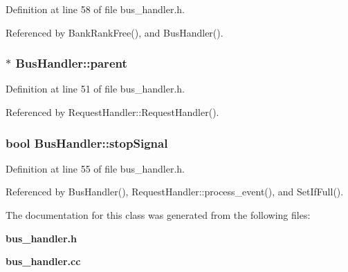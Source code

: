 Definition at line 58 of file bus\_\-handler.h.

Referenced by BankRankFree(), and BusHandler().
\subsubsection[{parent}]{$\ast$ {\bf BusHandler::parent}}\label{classBusHandler_940c0372eb5b0d7c8a163a01a3485598}




Definition at line 51 of file bus\_\-handler.h.

Referenced by RequestHandler::RequestHandler().
\subsubsection[{stopSignal}]{\setlength{\rightskip}{0pt plus 5cm}bool {\bf BusHandler::stopSignal}}\label{classBusHandler_9200377626ca177f01880335ccc0101e}




Definition at line 55 of file bus\_\-handler.h.

Referenced by BusHandler(), RequestHandler::process\_\-event(), and SetIfFull().

The documentation for this class was generated from the following files:\begin{CompactItemize}
\item 
{\bf bus\_\-handler.h}\item 
{\bf bus\_\-handler.cc}\end{CompactItemize}
